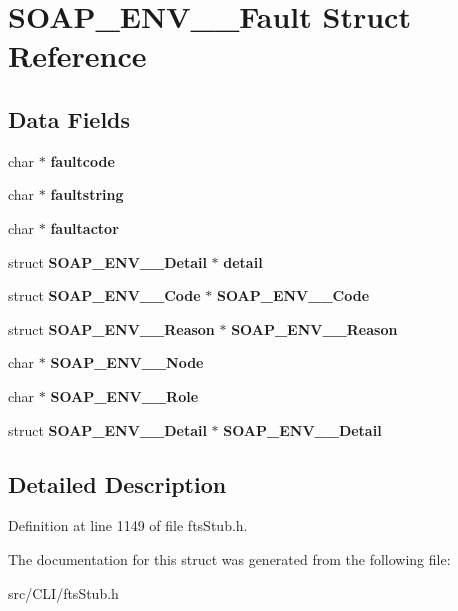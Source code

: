 \section{SOAP\_\-ENV\_\-\_\-Fault Struct Reference}
\label{structSOAP__ENV____Fault}
\subsection*{Data Fields}
\begin{DoxyCompactItemize}
\item 
char $\ast$ {\bfseries faultcode}\label{structSOAP__ENV____Fault_abf3a736463674fb5c5de7b866f444ec5}

\item 
char $\ast$ {\bfseries faultstring}\label{structSOAP__ENV____Fault_ac08b3725c7c6b2e9c636995e82876a9a}

\item 
char $\ast$ {\bfseries faultactor}\label{structSOAP__ENV____Fault_ae4c53ce0884ec757d48c1f62a516edce}

\item 
struct {\bf SOAP\_\-ENV\_\-\_\-Detail} $\ast$ {\bfseries detail}\label{structSOAP__ENV____Fault_af49c2a1926ebf4c865ddd444960b9adb}

\item 
struct {\bf SOAP\_\-ENV\_\-\_\-Code} $\ast$ {\bfseries SOAP\_\-ENV\_\-\_\-Code}\label{structSOAP__ENV____Fault_acec1784f16ffd14a69a92b92f0ddd15f}

\item 
struct {\bf SOAP\_\-ENV\_\-\_\-Reason} $\ast$ {\bfseries SOAP\_\-ENV\_\-\_\-Reason}\label{structSOAP__ENV____Fault_a921e9d8c41d62f32ab6d4d39a2e71bc9}

\item 
char $\ast$ {\bfseries SOAP\_\-ENV\_\-\_\-Node}\label{structSOAP__ENV____Fault_a07e508b520e8a1e2c8ba20acf1c2ddd9}

\item 
char $\ast$ {\bfseries SOAP\_\-ENV\_\-\_\-Role}\label{structSOAP__ENV____Fault_a9048c64196658de472d57fb42fae5daa}

\item 
struct {\bf SOAP\_\-ENV\_\-\_\-Detail} $\ast$ {\bfseries SOAP\_\-ENV\_\-\_\-Detail}\label{structSOAP__ENV____Fault_a560e6fd07a6b2f51cef97aa12282c870}

\end{DoxyCompactItemize}


\subsection{Detailed Description}


Definition at line 1149 of file ftsStub.h.



The documentation for this struct was generated from the following file:\begin{DoxyCompactItemize}
\item 
src/CLI/ftsStub.h\end{DoxyCompactItemize}
